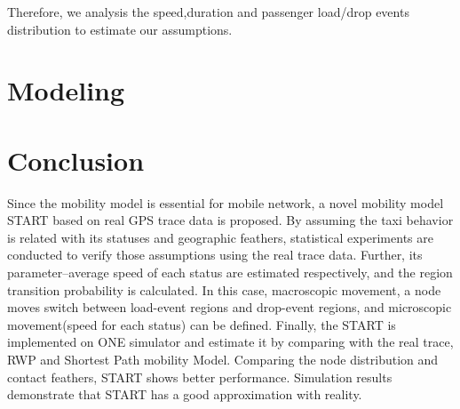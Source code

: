 \documentclass[twocolumn,10pt]{IEEEtran}
\begin{document}
   Therefore, we analysis the speed,duration and passenger load/drop events distribution to estimate our assumptions.








\section{Modeling}
\label{section_modeling}








\section{Conclusion}
\label{section_conclusion}
Since the mobility model is essential for mobile network, a novel mobility model START based on real GPS trace data is proposed. By assuming the taxi behavior is related with its statuses and geographic feathers, statistical experiments are conducted to verify those assumptions using the real trace data. Further, its parameter--average speed of each status are estimated respectively, and the region transition probability is calculated. In this case, macroscopic movement, a node moves switch between load-event regions and drop-event regions, and microscopic movement(speed for each status) can be defined. Finally, the START is implemented on ONE simulator and estimate it by comparing with the real trace, RWP and Shortest Path mobility Model.
Comparing the node distribution and contact feathers, START shows better performance.
Simulation results demonstrate that START has a good approximation with reality.






\end{document}
